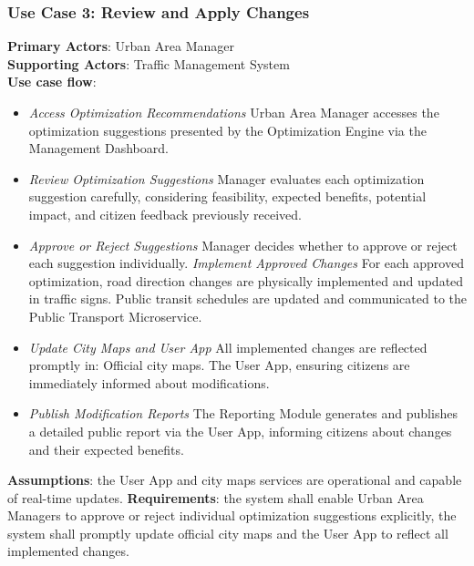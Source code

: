 \documentclass[a4paper,12pt]{article}
\begin{document}
\subsubsection*{Use Case 3: Review and Apply Changes}
\textbf{Primary Actors}: Urban Area Manager \\
\textbf{Supporting Actors}: Traffic Management System \\ 
\textbf{Use case flow}: 
\begin{itemize}
\item \textit{Access Optimization Recommendations} Urban Area Manager accesses the optimization suggestions presented by the Optimization Engine via the Management Dashboard.
\item \textit{Review Optimization Suggestions} Manager evaluates each optimization suggestion carefully, considering feasibility, expected benefits, potential impact, and citizen feedback previously received.
\item \textit{Approve or Reject Suggestions} Manager decides whether to approve or reject each suggestion individually.
\Item \textit{Implement Approved Changes} For each approved optimization, road direction changes are physically implemented and updated in traffic signs.
Public transit schedules are updated and communicated to the Public Transport Microservice.
\item \textit{Update City Maps and User App} All implemented changes are reflected promptly in: Official city maps.
The User App, ensuring citizens are immediately informed about modifications.
\item \textit{Publish Modification Reports} The Reporting Module generates and publishes a detailed public report via the User App, informing citizens about changes and their expected benefits.
\end{itemize}
\textbf{Assumptions}: the User App and city maps services are operational and capable of real-time updates.
\textbf{Requirements}: the system shall enable Urban Area Managers to approve or reject individual optimization suggestions explicitly, the system shall promptly update official city maps and the User App to reflect all implemented changes.
\end{document}

